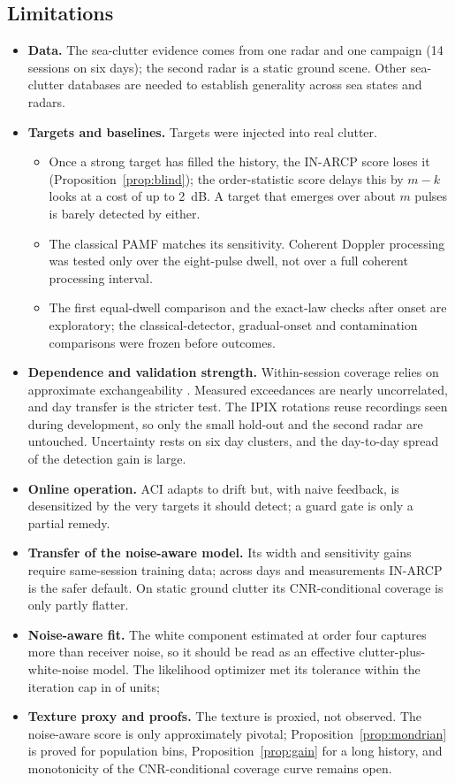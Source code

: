 \documentclass[journal]{IEEEtran}
\begin{document}
\subsection{Limitations}
\begin{itemize}[leftmargin=*,itemsep=1pt]
\item \textbf{Data.} The sea-clutter evidence comes from one radar and one campaign (14 sessions on six days); the second radar is a static ground scene. Other sea-clutter databases \cite{dewind2010csir} are needed to establish generality across sea states and radars.
\item \textbf{Targets and baselines.} Targets were injected into real clutter.
\begin{itemize}[leftmargin=*,itemsep=0pt]
\item Once a strong target has filled the history, the IN-ARCP score loses it (Proposition~\ref{prop:blind}); the order-statistic score delays this by $m-k$ looks at a cost of up to 2~dB. A target that emerges over about $m$ pulses is barely detected by either.
\item The classical PAMF matches its sensitivity. Coherent Doppler processing was tested only over the eight-pulse dwell, not over a full coherent processing interval.
\item The first equal-dwell comparison and the exact-law checks after onset are exploratory; the classical-detector, gradual-onset and contamination comparisons were frozen before outcomes.
\end{itemize}
\item \textbf{Dependence and validation strength.} Within-session coverage relies on approximate exchangeability \cite{barber2023}. Measured exceedances are nearly uncorrelated, and day transfer is the stricter test. The IPIX rotations reuse recordings seen during development, so only the small hold-out and the second radar are untouched. Uncertainty rests on six day clusters, and the day-to-day spread of the detection gain is large.
\item \textbf{Online operation.} ACI adapts to drift but, with naive feedback, is desensitized by the very targets it should detect; a guard gate is only a partial remedy.
\item \textbf{Transfer of the noise-aware model.} Its width and sensitivity gains require same-session training data; across days and measurements IN-ARCP is the safer default. On static ground clutter its CNR-conditional coverage is only partly flatter.
\item \textbf{Noise-aware fit.} The white component estimated at order four captures more than receiver noise, so it should be read as an effective clutter-plus-white-noise model. The likelihood optimizer met its tolerance within the iteration cap in \FitNAFourConv{} of \NUnitsConf{} units; \FitNAFourSentence
\item \textbf{Texture proxy and proofs.} The texture is proxied, not observed. The noise-aware score is only approximately pivotal; Proposition~\ref{prop:mondrian} is proved for population bins, Proposition~\ref{prop:gain} for a long history, and monotonicity of the CNR-conditional coverage curve remains open.
\end{itemize}
\end{document}
